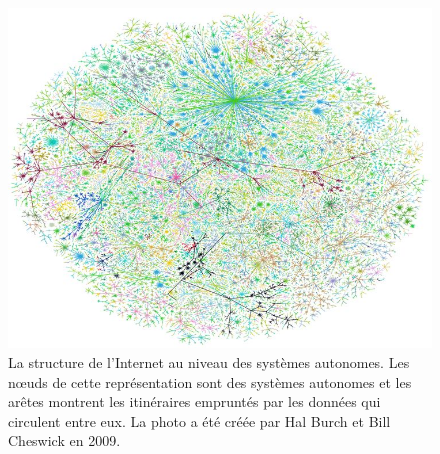\begin{figure}[h!]
	\centering
	\includegraphics[scale=0.4]{./figures/www2}
	\caption{La structure de l'Internet au niveau des systèmes autonomes. Les nœuds de cette représentation sont des systèmes autonomes et les arêtes montrent les itinéraires empruntés par les données qui circulent entre eux. La photo a été créée par Hal Burch et Bill Cheswick en 2009.}
	\label{WWW}
\end{figure}

